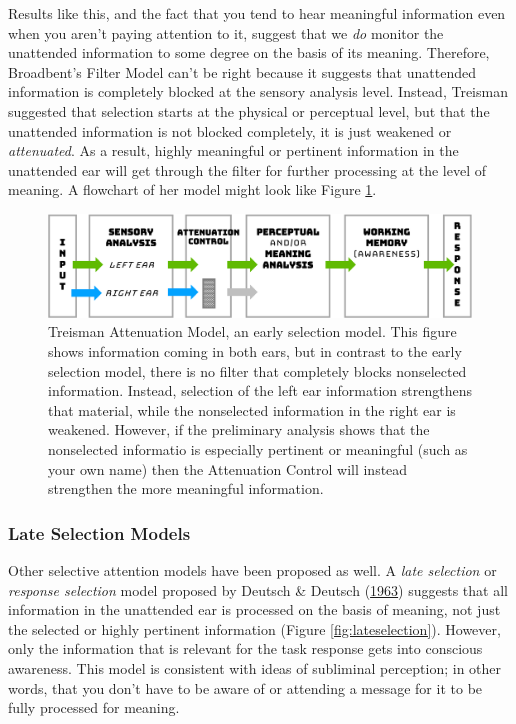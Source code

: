 \documentclass[
]{krantz}
\begin{document}
Results like this, and the fact that you tend to hear meaningful information even when you aren't paying attention to it, suggest that we \emph{do} monitor the unattended information to some degree on the basis of its meaning. Therefore, Broadbent's Filter Model can't be right because it suggests that unattended information is completely blocked at the sensory analysis level. Instead, Treisman suggested that selection starts at the physical or perceptual level, but that the unattended information is not blocked completely, it is just weakened or \emph{attenuated}. As a result, highly meaningful or pertinent information in the unattended ear will get through the filter for further processing at the level of meaning. A flowchart of her model might look like Figure \ref{fig:treisman}.

\begin{figure}

{\centering \includegraphics[width=0.8\linewidth]{images/3_attention/treisman} 

}

\caption{Treisman Attenuation Model, an early selection model. This figure shows information coming in both ears, but in contrast to the early selection model, there is no filter that completely blocks nonselected information. Instead, selection of the left ear information strengthens that material, while the nonselected information in the right ear is weakened. However, if the preliminary analysis shows that the nonselected informatio is especially pertinent or meaningful (such as your own name) then the Attenuation Control will instead strengthen the more meaningful information.}\label{fig:treisman}
\end{figure}

\hypertarget{late-selection-models}{%
\subsubsection*{Late Selection Models}\label{late-selection-models}}


Other selective attention models have been proposed as well. A \emph{late selection} or \emph{response selection} model proposed by Deutsch \& Deutsch (\protect\hyperlink{ref-Deutsch1963}{1963}) suggests that all information in the unattended ear is processed on the basis of meaning, not just the selected or highly pertinent information (Figure \ref{fig:lateselection}). However, only the information that is relevant for the task response gets into conscious awareness. This model is consistent with ideas of subliminal perception; in other words, that you don't have to be aware of or attending a message for it to be fully processed for meaning.
\end{document}
